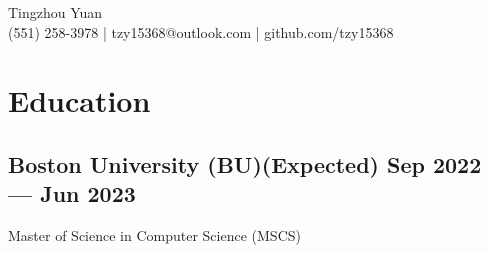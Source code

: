 \documentclass[a4,12pt]{article}
\newcommand{\hskills}[1]{
\textbf{\bfseries #1} }
\begin{document}
\vspace{-0.5cm}
\begin{center}
    \begin{minipage}[b]{0.7\textwidth}
            \centering
            {\huge Tingzhou Yuan} \\ %
            \vspace{0.1cm}
           (551) 258-3978  | tzy15368@outlook.com | github.com/tzy15368
    \end{minipage}%
    
\vspace{-0.35cm} 
\end{center}
\vspace{-0.4cm}

\section{\textbf{Education}}
\vspace{-0.2cm}
\subsection*{Boston University (BU)\hfill \textbf{(Expected) Sep 2022 --- Jun 2023}}
Master of Science in Computer Science (MSCS)\\
\end{document}

